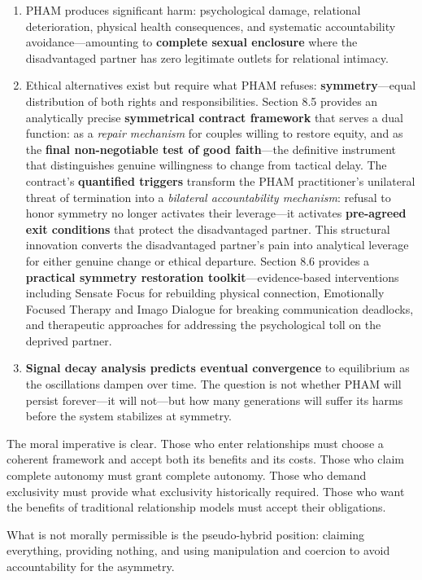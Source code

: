 \documentclass[12pt,openany]{book}
\numberwithin{equation}{chapter}
\begin{document}
\begin{enumerate}
    \item PHAM produces significant harm: psychological damage, relational deterioration, physical health consequences, and systematic accountability avoidance---amounting to \textbf{complete sexual enclosure} where the disadvantaged partner has zero legitimate outlets for relational intimacy.
    
    \item Ethical alternatives exist but require what PHAM refuses: \textbf{symmetry}---equal distribution of both rights and responsibilities. Section 8.5 provides an analytically precise \textbf{symmetrical contract framework} that serves a dual function: as a \textit{repair mechanism} for couples willing to restore equity, and as the \textbf{final non-negotiable test of good faith}---the definitive instrument that distinguishes genuine willingness to change from tactical delay. The contract's \textbf{quantified triggers} transform the PHAM practitioner's unilateral threat of termination into a \textit{bilateral accountability mechanism}: refusal to honor symmetry no longer activates their leverage---it activates \textbf{pre-agreed exit conditions} that protect the disadvantaged partner. This structural innovation converts the disadvantaged partner's pain into analytical leverage for either genuine change or ethical departure. Section 8.6 provides a \textbf{practical symmetry restoration toolkit}---evidence-based interventions including Sensate Focus for rebuilding physical connection, Emotionally Focused Therapy and Imago Dialogue for breaking communication deadlocks, and therapeutic approaches for addressing the psychological toll on the deprived partner.
    
    \item \textbf{Signal decay analysis predicts eventual convergence} to equilibrium as the oscillations dampen over time. The question is not whether PHAM will persist forever---it will not---but how many generations will suffer its harms before the system stabilizes at symmetry.
\end{enumerate}

The moral imperative is clear. Those who enter relationships must choose a coherent framework and accept both its benefits and its costs. Those who claim complete autonomy must grant complete autonomy. Those who demand exclusivity must provide what exclusivity historically required. Those who want the benefits of traditional relationship models must accept their obligations.

What is not morally permissible is the pseudo-hybrid position: claiming everything, providing nothing, and using manipulation and coercion to avoid accountability for the asymmetry.
\end{document}
